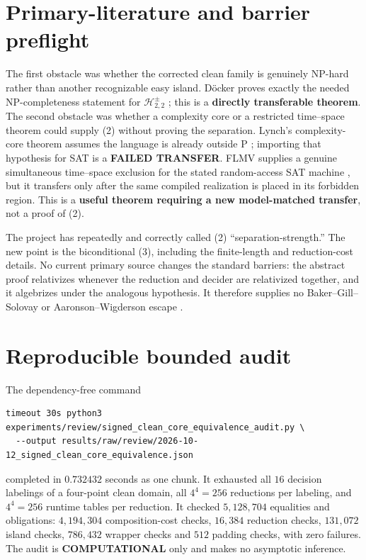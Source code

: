 \documentclass[11pt]{article}
\newcommand{\Hsigned}{\mathcal H^{\pm}_{2,2}}
\newcommand{\COMP}{\textbf{COMPUTATIONAL}}
\begin{document}
\section{Primary-literature and barrier preflight}

The first obstacle was whether the corrected clean family is genuinely
NP-hard rather than another recognizable easy island.  D\"ocker proves
exactly the needed NP-completeness statement for $\Hsigned$ \cite{Docker19};
this is a \textbf{directly transferable theorem}.  The second obstacle was
whether a complexity core or a restricted time--space theorem could supply
(2) without proving the separation.  Lynch's complexity-core theorem assumes
the language is already outside P \cite{Lynch75}; importing that hypothesis
for SAT is a \textbf{FAILED TRANSFER}.  FLMV supplies a genuine simultaneous
time--space exclusion for the stated random-access SAT machine
\cite{FLMV05}, but it transfers only after the same compiled realization is
placed in its forbidden region.  This is a \textbf{useful theorem requiring
a new model-matched transfer}, not a proof of (2).

The project has repeatedly and correctly called (2) ``separation-strength.''
The new point is the biconditional (3), including the finite-length and
reduction-cost details.  No current primary source changes the standard
barriers: the abstract proof relativizes whenever the reduction and decider
are relativized together, and it algebrizes under the analogous hypothesis.
It therefore supplies no Baker--Gill--Solovay or Aaronson--Wigderson escape
\cite{BGS75,AW09}.

\section{Reproducible bounded audit}

The dependency-free command
\begin{verbatim}
timeout 30s python3 experiments/review/signed_clean_core_equivalence_audit.py \
  --output results/raw/review/2026-10-12_signed_clean_core_equivalence.json
\end{verbatim}
completed in $0.732432$ seconds as one chunk.  It exhausted all $16$ decision
labelings of a four-point clean domain, all $4^4=256$ reductions per
labeling, and $4^4=256$ runtime tables per reduction.  It checked
$5{,}128{,}704$ equalities and obligations: $4{,}194{,}304$ composition-cost
checks, $16{,}384$ reduction checks, $131{,}072$ island checks, $786{,}432$
wrapper checks and $512$ padding checks, with zero failures.  The audit is
\COMP{} only and makes no asymptotic inference.
\end{document}
